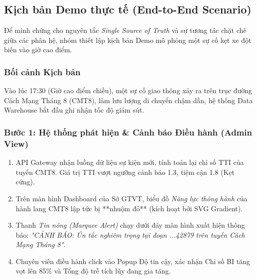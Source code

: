 \subsection{Kịch bản Demo thực tế (End-to-End Scenario)}

Để minh chứng cho nguyên tắc \textit{Single Source of Truth} và sự tương tác chặt chẽ giữa các phân hệ, nhóm thiết lập kịch bản Demo mô phỏng một sự cố kẹt xe đột biến vào giờ cao điểm.

\subsubsection{Bối cảnh Kịch bản}
Vào lúc 17:30 (Giờ cao điểm chiều), một sự cố giao thông xảy ra trên trục đường Cách Mạng Tháng 8 (CMT8), làm lưu lượng di chuyển chậm dần, hệ thống Data Warehouse bắt đầu ghi nhận tốc độ giảm sút.

\subsubsection{Bước 1: Hệ thống phát hiện \& Cảnh báo Điều hành (Admin View)}
\begin{enumerate}
    \item API Gateway nhận luồng dữ liệu sự kiện mới, tính toán lại chỉ số TTI của tuyến CMT8. Giá trị TTI vượt ngưỡng cảnh báo 1.3, tiệm cận 1.8 (Kẹt cứng).
    \item Trên màn hình Dashboard của Sở GTVT, biểu đồ \textit{Năng lực thông hành} của hành lang CMT8 lập tức bị **nhuộm đỏ** (kích hoạt bởi SVG Gradient).
    \item Thanh \textit{Tin nóng (Marquee Alert)} chạy dưới đáy màn hình xuất hiện thông báo: \textit{"CẢNH BÁO: Ún tắc nghiêm trọng tại đoạn ...42879 trên tuyến Cách Mạng Tháng 8"}.
    \item Chuyên viên điều hành click vào Popup Độ tin cậy, xác nhận Chỉ số BI tăng vọt lên 85\% và Tổng độ trễ tích lũy đang gia tăng.
\end{enumerate}

